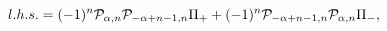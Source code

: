 \begin{equation}
l.h.s.= (-1)^n{\cal P}_{\alpha,n}{\cal P}_{-\alpha +n-1,n}
\Pi_+
+(-1)^n{\cal P}_{-\alpha+n-1,n}{\cal P}_{\alpha,n}\Pi_-,
\label{lhs}
\end{equation}

